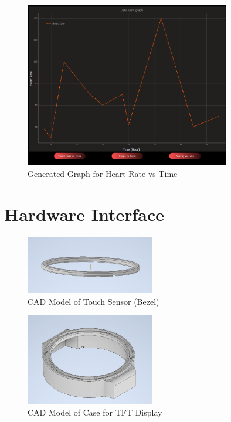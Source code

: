 \documentclass[12pt, titlepage]{article}
\begin{document}
\begin{figure}[H]
	\begin{center}
		 \includegraphics[width=0.8\textwidth]{Graph}
		\caption{Generated Graph for Heart Rate vs Time}
		\label{Graph} 
	\end{center}
\end{figure}
\section{Hardware Interface}
\label{MechHardware}
\begin{figure}[H]
	\begin{center}
		 \includegraphics[width=0.5\textwidth]{BezelCAD}
		\caption{CAD Model of Touch Sensor (Bezel)}
		\label{BezelCAD} 
	\end{center}
\end{figure}

\begin{figure}[H]
	\begin{center}
		 \includegraphics[width=0.5\textwidth]{DisplayCaseCAD}
		\caption{CAD Model of Case for TFT Display}
		\label{DisplayCaseCAD} 
	\end{center}
\end{figure}
\end{document}
